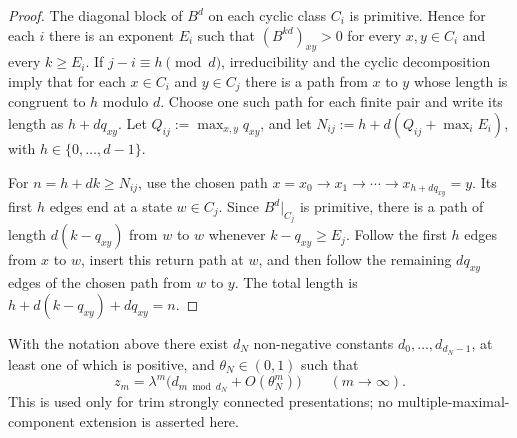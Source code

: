 \begin{proof}
  The diagonal block of \(B^d\) on each cyclic class \(C_i\) is
  primitive. Hence for each \(i\) there is an exponent \(E_i\) such that
  \((B^{kd})_{xy}>0\) for every \(x,y\in C_i\) and every \(k\ge E_i\).
  If \(j-i\equiv h\pmod d\), irreducibility and the cyclic
  decomposition imply that for each \(x\in C_i\) and \(y\in C_j\) there
  is a path from \(x\) to \(y\) whose length is congruent to \(h\)
  modulo \(d\). Choose one such path for each finite pair and write its
  length as \(h+dq_{xy}\). Let \(Q_{ij}:=\max_{x,y}q_{xy}\), and let
  \(N_{ij}:=h+d(Q_{ij}+\max_iE_i)\), with
  \(h\in\{0,\dots,d-1\}\).

  For \(n=h+dk\ge N_{ij}\), use the chosen path
  \(x=x_0\to x_1\to\cdots\to x_{h+dq_{xy}}=y\). Its first \(h\) edges
  end at a state \(w\in C_j\). Since \(B^d|_{C_j}\) is primitive, there
  is a path of length \(d(k-q_{xy})\) from \(w\) to \(w\) whenever
  \(k-q_{xy}\ge E_j\). Follow the first \(h\) edges from \(x\) to \(w\),
  insert this return path at \(w\), and then follow the remaining
  \(dq_{xy}\) edges of the chosen path from \(w\) to \(y\). The total
  length is \(h+d(k-q_{xy})+dq_{xy}=n\).
\end{proof}

\begin{lemma}
  \label{lem:trim-density}
  With the notation above there exist \(d_N\) non-negative constants
  \(d_0,\dots,d_{d_N-1}\), at least one of which is positive, and
  \(\theta_N\in(0,1)\) such that
  \[
    z_m=\lambda^m\bigl(d_{m\bmod d_N}+O(\theta_N^m)\bigr)
    \qquad (m\to\infty).
  \]
  This is used only for trim strongly connected presentations; no
  multiple-maximal-component extension is asserted here.
\end{lemma}

